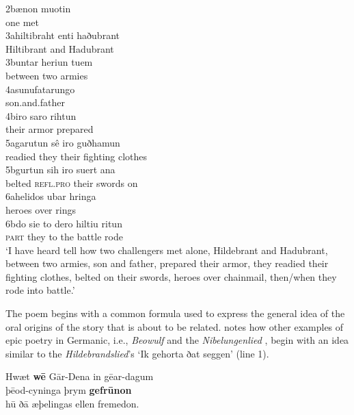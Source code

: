 2b\tab \gll ænon   muotin\\
           one     met\\

3a\tab \gll hiltibraht  enti    haðubrant\\
            Hiltibrant   and    Hadubrant\\

3b\tab \gll untar     heriun  tuem\\
            between   two     armies\\

4a\tab \gll sunufatarungo\\
            son.and.father\\

4b\tab \gll iro    saro   rihtun\\
            their   armor  prepared\\

5a\tab \gll garutun  sê    iro     guðhamun\\
            readied  they    their   {fighting clothes}\\

5b\tab \gll gurtun  sih        iro     suert  ana \\
            belted   \textsc{refl.pro}  their  swords   on\\

6a\tab \gll helidos   ubar  hringa\\
            heroes  over   rings\\

6b\tab \gll do     sie    to  dero   hiltiu  ritun\\
            \textsc{part}  they   to  the    battle  rode\\

‘I have heard tell how two challengers met alone, Hildebrant and Hadubrant, between two armies, son and father, prepared their armor, they readied their fighting clothes, belted on their swords, heroes over chainmail, then/when they rode into battle.’
    \z

\noindent The poem begins with a common formula used to express the general idea of the oral origins of the story that is about to be related. \citet[56]{Reichl2010} notes how other examples of epic poetry in Germanic, i.e., \textit{Beowulf}  and the \textit{Nibelungenlied} , begin with an idea similar to the \textit{Hildebrandslied}’s ‘Ik gehorta ðat seggen’ (line 1).

\ea%
    \label{ex:6:18}
Hwæt \textbf{wē} Gār-Dena \qquad in gēar-dagum\\
þēod-cyninga \qquad þrym \textbf{gefrūnon}\\
hū ðā æþelingas \qquad ellen fremedon.\\\medskip


